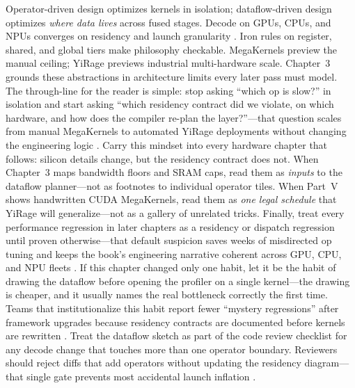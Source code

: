 Operator-driven design optimizes kernels in isolation; dataflow-driven design optimizes \emph{where data lives} across fused stages.
Decode on GPUs, CPUs, and NPUs converges on residency and launch granularity \citep{patel2025llminference,memoryfloor2026}.
Iron rules on register, shared, and global tiers make philosophy checkable.
MegaKernels preview the manual ceiling; YiRage previews industrial multi-hardware scale.
Chapter~3 grounds these abstractions in architecture limits every later pass must model.
The through-line for the reader is simple: stop asking ``which op is slow?'' in isolation and start asking ``which residency contract did we violate, on which hardware, and how does the compiler re-plan the layer?''---that question scales from manual MegaKernels to automated YiRage deployments without changing the engineering logic \citep{taxbreak2026,memoryfloor2026,amd2024xdna}.
Carry this mindset into every hardware chapter that follows: silicon details change, but the residency contract does not.
When Chapter~3 maps bandwidth floors and SRAM caps, read them as \emph{inputs} to the dataflow planner---not as footnotes to individual operator tiles.
When Part~V shows handwritten CUDA MegaKernels, read them as \emph{one legal schedule} that YiRage will generalize---not as a gallery of unrelated tricks.
Finally, treat every performance regression in later chapters as a residency or dispatch regression until proven otherwise---that default suspicion saves weeks of misdirected op tuning and keeps the book's engineering narrative coherent across GPU, CPU, and NPU fleets \citep{taxbreak2026,memoryfloor2026}.
If this chapter changed only one habit, let it be the habit of drawing the dataflow before opening the profiler on a single kernel---the drawing is cheaper, and it usually names the real bottleneck correctly the first time.
Teams that institutionalize this habit report fewer ``mystery regressions'' after framework upgrades because residency contracts are documented before kernels are rewritten \citep{taxbreak2026,memoryfloor2026}.
Treat the dataflow sketch as part of the code review checklist for any decode change that touches more than one operator boundary.
Reviewers should reject diffs that add operators without updating the residency diagram---that single gate prevents most accidental launch inflation \citep{taxbreak2026}.


